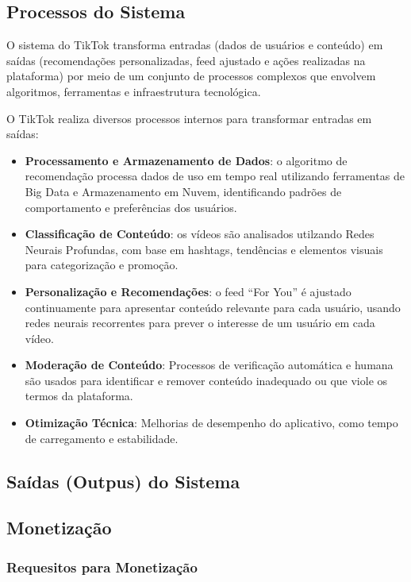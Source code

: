 \newpage
\subsection{Processos do Sistema}

O sistema do TikTok transforma entradas (dados de usuários e conteúdo) em saídas (recomendações personalizadas, feed ajustado e ações realizadas na plataforma) por meio de um conjunto de processos complexos que envolvem algoritmos, ferramentas e infraestrutura tecnológica. \vskip0.3cm

O TikTok realiza diversos processos internos para transformar entradas em saídas:

\begin{itemize}
    \item \textbf{Processamento e Armazenamento de Dados}: o algoritmo de recomendação processa dados de uso em tempo real utilizando ferramentas de Big Data e Armazenamento em Nuvem, identificando padrões de comportamento e preferências dos usuários.
    \item \textbf{Classificação de Conteúdo}: os vídeos são analisados utilzando Redes Neurais Profundas, com base em hashtags, tendências e elementos visuais para categorização e promoção.
    \item \textbf{Personalização e Recomendações}: o feed “For You” é ajustado continuamente para apresentar conteúdo relevante para cada usuário, usando redes neurais recorrentes para prever o interesse de um usuário em cada vídeo.
    \item \textbf{Moderação de Conteúdo}: Processos de verificação automática e humana são usados para identificar e remover conteúdo inadequado ou que viole os termos da plataforma.
    \item \textbf{Otimização Técnica}: Melhorias de desempenho do aplicativo, como tempo de carregamento e estabilidade.
\end{itemize}


\newpage
\subsection{Saídas (Outpus) do Sistema}

\subsection{Monetização}
\subsubsection{Requesitos para Monetização}

